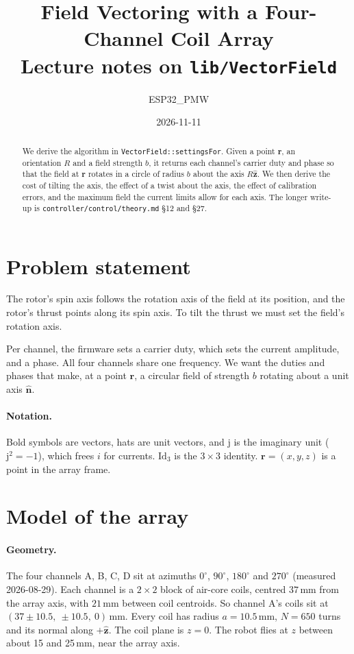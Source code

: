 \documentclass[11pt]{article}
\title{Field Vectoring with a Four-Channel Coil Array\\[2pt]\large Lecture notes on \texttt{lib/VectorField}}
\author{ESP32\_PMW}
\date{2026-11-11}
\newcommand{\vb}[1]{\mathbf{#1}}
\newcommand{\uv}[1]{\hat{\mathbf{#1}}}
\newcommand{\jj}{\mathrm{j}}
\newcommand{\Id}{\mathrm{Id}}
\begin{document}
\maketitle

\begin{abstract}
We derive the algorithm in \texttt{VectorField::settingsFor}. Given a point $\vb r$, an
orientation $R$ and a field strength $b$, it returns each channel's carrier duty and phase so that
the field at $\vb r$ rotates in a circle of radius $b$ about the axis $R\uv z$. We then derive the
cost of tilting the axis, the effect of a twist about the axis, the effect of calibration errors,
and the maximum field the current limits allow for each axis. The longer write-up is
\texttt{controller/control/theory.md} \S12 and \S27.
\end{abstract}

\section{Problem statement}

The rotor's spin axis follows the rotation axis of the field at its position, and the rotor's
thrust points along its spin axis. To tilt the thrust we must set the field's rotation axis.

Per channel, the firmware sets a carrier duty, which sets the current amplitude, and a phase. All
four channels share one frequency. We want the duties and phases that make, at a point $\vb r$, a
circular field of strength $b$ rotating about a unit axis $\uv n$.

\paragraph{Notation.} Bold symbols are vectors, hats are unit vectors, and $\jj$ is the
imaginary unit ($\jj^2=-1$), which frees $i$ for currents. $\Id_3$ is the $3\times3$ identity.
$\vb r=(x,y,z)$ is a point in the array frame.

\section{Model of the array}

\paragraph{Geometry.} The four channels A, B, C, D sit at azimuths $0^\circ$, $90^\circ$,
$180^\circ$ and $270^\circ$ (measured 2026-08-29). Each channel is a $2\times2$ block of air-core
coils, centred $37$\,mm from the array axis, with $21$\,mm between coil centroids. So channel A's
coils sit at $(37\pm10.5,\ \pm10.5,\ 0)$\,mm. Every coil has radius $a=10.5$\,mm, $N=650$ turns and
its normal along $+\uv z$. The coil plane is $z=0$. The robot flies at $z$ between about 15 and
25\,mm, near the array axis.
\end{document}
